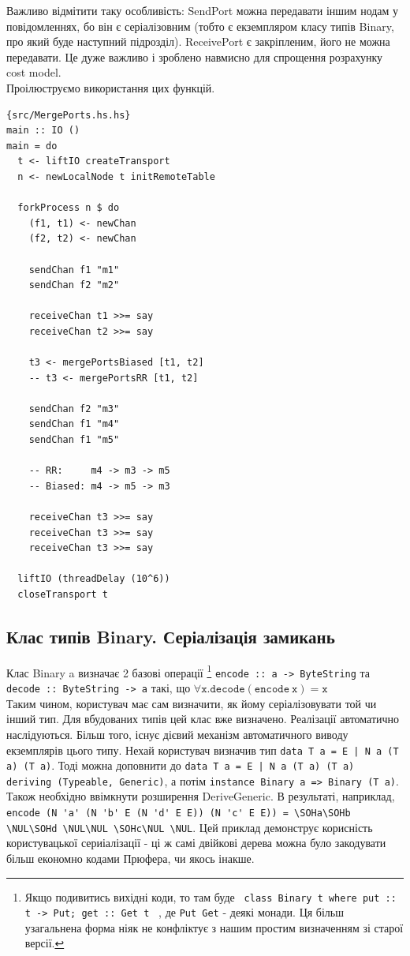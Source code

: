 \documentclass[12pt]{article}
\begin{document}
Важливо відмітити таку особливість: SendPort можна передавати іншим нодам у повідомленнях, бо він є серіалізовним (тобто є екземпляром класу типів Binary, про який буде наступний підрозділ). ReceivePort є закріпленим, його не можна передавати. Це дуже важливо і зроблено навмисно для спрощення розрахунку cost model.\\

Проілюструємо використання цих функцій.

\begin{lstlisting}{src/MergePorts.hs.hs}
main :: IO ()
main = do
  t <- liftIO createTransport
  n <- newLocalNode t initRemoteTable

  forkProcess n $ do
    (f1, t1) <- newChan
    (f2, t2) <- newChan

    sendChan f1 "m1"
    sendChan f2 "m2"

    receiveChan t1 >>= say
    receiveChan t2 >>= say

    t3 <- mergePortsBiased [t1, t2]
    -- t3 <- mergePortsRR [t1, t2]

    sendChan f2 "m3"
    sendChan f1 "m4"
    sendChan f1 "m5"

    -- RR:     m4 -> m3 -> m5
    -- Biased: m4 -> m5 -> m3
    
    receiveChan t3 >>= say
    receiveChan t3 >>= say
    receiveChan t3 >>= say

  liftIO (threadDelay (10^6))
  closeTransport t

\end{lstlisting}

\subsection{Клас типів Binary. Серіалізація замикань}

Клас Binary a визначає 2 базові операції
\footnote{Якщо подивитись вихідні коди, то там буде
\lstinline| class Binary t where put :: t -> Put; get :: Get t |
, де \lstinline|Put Get| - деякі монади. Ця більш узагальнена форма ніяк 
не конфліктує з нашим простим визначенням зі старої версії.}
\lstinline{encode :: a -> ByteString} та \lstinline{decode :: ByteString -> a} 
такі, що $\forall \mathtt{x} . \mathtt{decode (encode \ x)} = \mathtt{x}$\\

Таким чином, користувач має сам визначити, як йому серіалізовувати той чи інший тип.
Для вбудованих типів цей клас вже визначено. Реалізації автоматично наслідуються. 
Більш того, існує дієвий механізм автоматичного виводу екземплярів цього типу.
Нехай користувач визначив тип \lstinline{data T a = E | N a (T a) (T a)}.
Тоді можна доповнити до \lstinline{data T a = E | N a (T a) (T a) deriving (Typeable, Generic)}, а потім \lstinline{instance Binary a => Binary (T a)}. Також необхідно ввімкнути розширення DeriveGeneric. В результаті, наприклад, \lstinline{encode (N 'a' (N 'b' E (N 'd' E E)) (N 'c' E E)) = \SOHa\SOHb \NUL\SOHd \NUL\NUL \SOHc\NUL \NUL}. Цей приклад демонструє корисність користувацької сериіалізації - ці ж самі двійкові дерева можна було закодувати більш економно кодами Прюфера, чи якось інакше.\\
\end{document}

